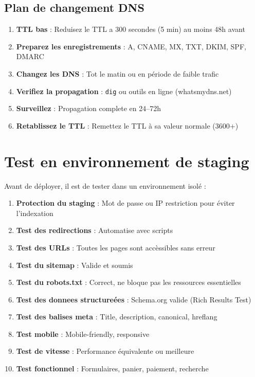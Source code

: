 \subsection{Plan de changement DNS}

\begin{enumerate}
    \item \textbf{TTL bas} : Reduisez le TTL a 300 secondes (5 min) au moins 48h avant
    \item \textbf{Preparez les enregistrements} : A, CNAME, MX, TXT, DKIM, SPF, DMARC
    \item \textbf{Changez les DNS} : Tot le matin ou en période de faible trafic
    \item \textbf{Verifiez la propagation} : \texttt{dig} ou outils en ligne (whatsmydns.net)
    \item \textbf{Surveillez} : Propagation complete en 24--72h
    \item \textbf{Retablissez le TTL} : Remettez le TTL à sa valeur normale (3600+)
\end{enumerate}


\section{Test en environnement de staging}

Avant de déployer, il est  de tester dans un environnement isolé :

\begin{enumerate}
    \item \textbf{Protection du staging} : Mot de passe ou IP restriction pour éviter l'indexation
    \item \textbf{Test des redirections} : Automatise avec scripts
    \item \textbf{Test des URLs} : Toutes les pages sont accèssibles sans erreur
    \item \textbf{Test du sitemap} : Valide et soumis
    \item \textbf{Test du robots.txt} : Correct, ne bloque pas les ressources essentielles
    \item \textbf{Test des donnees structureées} : Schema.org valide (Rich Results Test)
    \item \textbf{Test des balises meta} : Title, description, canonical, hreflang
    \item \textbf{Test mobile} : Mobile-friendly, responsive
    \item \textbf{Test de vitesse} : Performance équivalente ou meilleure
    \item \textbf{Test fonctionnel} : Formulaires, panier, paiement, recherche
\end{enumerate}

